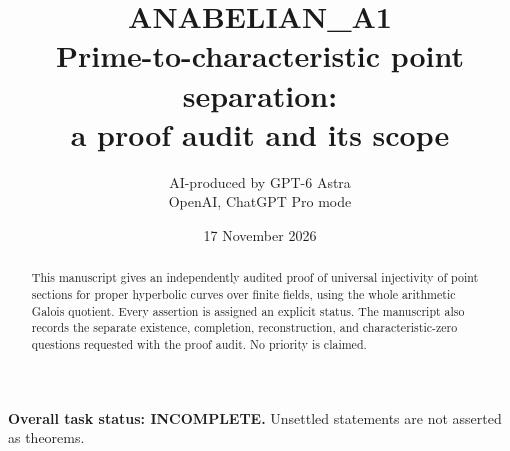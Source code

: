 \documentclass[11pt,a4paper]{article}
\title{ANABELIAN\_A1\\Prime-to-characteristic point separation:\\a proof audit and its scope}
\author{AI-produced by GPT-6 Astra\\OpenAI, ChatGPT Pro mode}
\date{17 November 2026}
\begin{document}
\maketitle
\begin{abstract}
This manuscript gives an independently audited proof of universal injectivity
of point sections for proper hyperbolic curves over finite fields, using
the whole arithmetic Galois quotient. Every assertion is assigned an
explicit status. The manuscript also records the separate existence,
completion, reconstruction, and characteristic-zero questions requested
with the proof audit. No priority is claimed.
\end{abstract}
\noindent\textbf{Overall task status: INCOMPLETE.}
Unsettled statements are not asserted as theorems.
\tableofcontents
\end{document}
